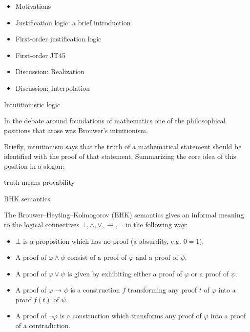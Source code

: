 \documentclass{beamer}
\theoremstyle{definition}
\newcommand{\nao}{\neg}
\newcommand{\e}{\wedge}
\newcommand{\ou}{\vee}
\newcommand{\impli}{\rightarrow}
\begin{document}
\begin{frame}
	\begin{itemize}
	\item[] {Motivations}
	\vspace{5mm}		
	\item[]{\color{blue}Justification logic: a brief introduction}
	\vspace{5mm}
	\item[] First-order justification logic
	\vspace{5mm}
	\item[] First-order JT45
	\vspace{5mm}
	\item[] Discussion: Realization
	\vspace{5mm}
	\item[] Discussion: Interpolation
	\end{itemize} 
\end{frame}


\begin{frame} {Intuiitionistic logic}

\qquad In the debate around foundations of mathematics one of the philosophical positions that arose was Brouwer's intuitionism. 

\vspace{5mm}

\qquad Briefly, intuitionism says that the truth of a mathematical statement should be identified with the proof of that statement. Summarizing the core idea of this position in a slogan: 

\begin{center}
{\color{blue} truth means provability}
\end{center}

\end{frame}


\begin{frame} {BHK semantics}

\qquad The Brouwer–Heyting–Kolmogorov (BHK) semantics gives an informal meaning to the logical connectives $\bot, \e, \ou, \impli, \nao$ in the following way:

\begin{itemize}
	\item $\bot$ is a proposition which has no proof (a absurdity, e.g. $0=1$).
	\item A proof of $\varphi \e \psi$ consist of a proof of $\varphi$ and a proof of $\psi$.
	\item A proof of $\varphi \ou \psi$ is given by exhibiting either a proof of $\varphi$ or a proof of $\psi$.
	\item A proof of $\varphi \impli \psi$ is a construction $f$ transforming any proof $t$ of $\varphi$ into a proof $f(t)$ of $\psi$.
	\item A proof of $\nao \varphi$ is a construction which transforms any proof of $\varphi$ into a proof of a contradiction. 
\end{itemize}

\end{frame}
\end{document}
